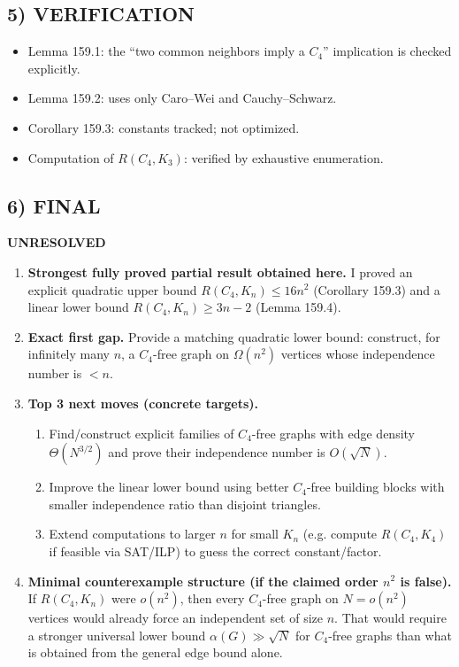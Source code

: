 \subsection*{5) VERIFICATION}
\begin{itemize}
\item Lemma 159.1: the ``two common neighbors imply a $C_4$'' implication is checked explicitly.
\item Lemma 159.2: uses only Caro--Wei and Cauchy--Schwarz.
\item Corollary 159.3: constants tracked; not optimized.
\item Computation of $R(C_4,K_3)$: verified by exhaustive enumeration.
\end{itemize}

\subsection*{6) FINAL}
\textbf{UNRESOLVED}

\begin{enumerate}
\item[(i)] \textbf{Strongest fully proved partial result obtained here.}
I proved an explicit quadratic upper bound $R(C_4,K_n)\le 16n^2$ (Corollary 159.3) and a linear lower bound $R(C_4,K_n)\ge 3n-2$ (Lemma 159.4).

\item[(ii)] \textbf{Exact first gap.}
Provide a matching quadratic lower bound: construct, for infinitely many $n$, a $C_4$-free graph on $\Omega(n^2)$ vertices whose independence number is $<n$.

\item[(iii)] \textbf{Top 3 next moves (concrete targets).}
\begin{enumerate}
\item Find/construct explicit families of $C_4$-free graphs with edge density $\Theta(N^{3/2})$ and prove their independence number is $O(\sqrt N)$.
\item Improve the linear lower bound using better $C_4$-free building blocks with smaller independence ratio than disjoint triangles.
\item Extend computations to larger $n$ for small $K_n$ (e.g. compute $R(C_4,K_4)$ if feasible via SAT/ILP) to guess the correct constant/factor.
\end{enumerate}

\item[(iv)] \textbf{Minimal counterexample structure (if the claimed order $n^2$ is false).}
If $R(C_4,K_n)$ were $o(n^2)$, then every $C_4$-free graph on $N=o(n^2)$ vertices would already force an independent set of size $n$. That would require a stronger universal lower bound $\alpha(G)\gg \sqrt N$ for $C_4$-free graphs than what is obtained from the general edge bound alone.
\end{enumerate}



